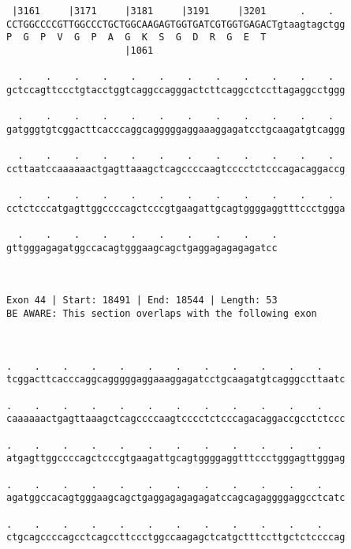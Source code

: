 \documentclass{article}
\begin{document}
\begin{Verbatim}
 |3161     |3171     |3181     |3191     |3201      .    .  
CCTGGCCCCGTTGGCCCTGCTGGCAAGAGTGGTGATCGTGGTGAGACTgtaagtagctgg
P  G  P  V  G  P  A  G  K  S  G  D  R  G  E  T              
                     |1061                                  
  
  .    .    .    .    .    .    .    .    .    .    .    .  
gctccagttccctgtacctggtcaggccagggactcttcaggcctccttagaggcctggg
                                                            
  .    .    .    .    .    .    .    .    .    .    .    .  
gatgggtgtcggacttcacccaggcagggggaggaaaggagatcctgcaagatgtcaggg
                                                            
  .    .    .    .    .    .    .    .    .    .    .    .  
ccttaatccaaaaaactgagttaaagctcagccccaagtcccctctcccagacaggaccg
                                                            
  .    .    .    .    .    .    .    .    .    .    .    .  
cctctcccatgagttggccccagctcccgtgaagattgcagtggggaggtttccctggga
                                                            
  .    .    .    .    .    .    .    .    .    .
gttgggagagatggccacagtgggaagcagctgaggagagagagatcc
                                                
                                                
 
Exon 44 | Start: 18491 | End: 18544 | Length: 53
BE AWARE: This section overlaps with the following exon



.    .    .    .    .    .    .    .    .    .    .    .    
tcggacttcacccaggcagggggaggaaaggagatcctgcaagatgtcagggccttaatc
                                                            
.    .    .    .    .    .    .    .    .    .    .    .    
caaaaaactgagttaaagctcagccccaagtcccctctcccagacaggaccgcctctccc
                                                            
.    .    .    .    .    .    .    .    .    .    .    .    
atgagttggccccagctcccgtgaagattgcagtggggaggtttccctgggagttgggag
                                                            
.    .    .    .    .    .    .    .    .    .    .    .    
agatggccacagtgggaagcagctgaggagagagagatccagcagaggggaggcctcatc
                                                            
.    .    .    .    .    .    .    .    .    .    .    .    
ctgcagccccagcctcagccttccctggccaagagctcatgctttccttgctctccccag
                                                            

\end{Verbatim}
\end{document}
